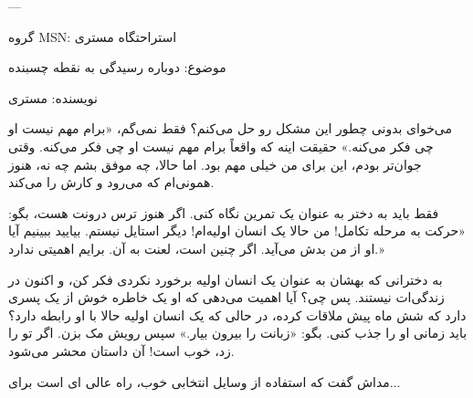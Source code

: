 ---

گروه MSN: استراحتگاه مستری

موضوع: دوباره رسیدگی به نقطه چسبنده

نویسنده: مستری

می‌خوای بدونی چطور این مشکل رو حل می‌کنم؟ فقط نمی‌گم، «برام مهم نیست او چی فکر می‌کنه.» حقیقت اینه که واقعاً برام مهم نیست او چی فکر می‌کنه. وقتی جوان‌تر بودم، این برای من خیلی مهم بود. اما حالا، چه موفق بشم چه نه، هنوز همونی‌ام که می‌رود و کارش را می‌کند.

فقط باید به دختر به عنوان یک تمرین نگاه کنی. اگر هنوز ترس درونت هست، بگو: «حرکت به مرحله تکامل! من حالا یک انسان اولیه‌ام! دیگر استایل نیستم. بیایید ببینیم آیا او از من بدش می‌آید. اگر چنین است، لعنت به آن. برایم اهمیتی ندارد.»

به دخترانی که بهشان به عنوان یک انسان اولیه برخورد نکردی فکر کن، و اکنون در زندگی‌ات نیستند. پس چی؟ آیا اهمیت می‌دهی که او یک خاطره خوش از یک پسری دارد که شش ماه پیش ملاقات کرده، در حالی که یک انسان اولیه حالا با او رابطه دارد؟ باید زمانی او را جذب کنی. بگو: «زبانت را بیرون بیار.» سپس رویش مک بزن. اگر تو را زد، خوب است! آن داستان محشر می‌شود.

مداش گفت که استفاده از وسایل انتخابی خوب، راه عالی ای است برای...
